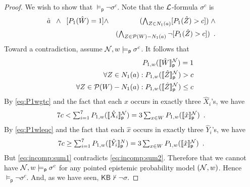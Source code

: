 \documentclass[12pt]{article}
\theoremstyle{definition}
\newcommand{\pow}{{\cal P}}    %
\newcommand{\N}{{\cal N}}      %
\newcommand{\Lang}{{\cal L}}   %
\newcommand{\KB}{{\mathsf{KB}}}                        %
\newcommand{\modelsp}{\models_{\mathsf{p}}}                  %
\newcommand{\semp}[1]{\llbracket{#1}\rrbracket_{\mathsf{p}}} %
\begin{document}
\begin{proof}
  We wish to show that $\modelsp\lnot\sigma^c$.
  Note that the $\Lang$-formula $\sigma^c$ is
  \begin{eqnarray*}
    \hat a \;\;\land\;\; [P_1(\hat W)=1] &\land& 
    \textstyle(\bigwedge_{Z\in N_1(a)} [P_1(\hat Z)>c])
    \;\land 
    \\
    && 
    \textstyle(\bigwedge_{Z\in\pow(W)-N_1(a)}\lnot [P_1(\hat Z)>c]) \enspace.
  \end{eqnarray*}
  Toward a contradiction, assume $\N,w\modelsp\sigma^c$.  It follows that
  \begin{eqnarray}
    && P_{1,w}(\semp{\hat W}^\N)=1
    \label{eq:P1weq1}
    \\
    && \forall Z\in N_1(a): P_{1,w}(\semp{\hat Z}^\N)>c
    \label{eq:P1wgtc}
    \\
    && \forall Z\in\pow(W)-N_1(a): P_{1,w}(\semp{\hat Z}^\N)\leq c
    \label{eq:P1wleqc}
  \end{eqnarray}
  By \eqref{eq:P1wgtc} and the fact that each $\hat x$ occurs
  in exactly three $\hat X_i$'s, we have
  \begin{equation}
    \textstyle
    7c<\sum_{i=1}^7P_{1,w}(\semp{\hat X_i}^\N)=3\sum_{x\in W}P_{1,w}(\semp{\hat x}^\N)\enspace.
    \label{eq:incomp:sum1}
  \end{equation}
  By \eqref{eq:P1wleqc} and the fact that each $\hat x$ occurs
  in exactly three $\hat Y_i$'s, we have
  \begin{equation}
    \textstyle
    7c\geq\sum_{i=1}^7P_{1,w}(\semp{\hat Y_i}^N)=3\sum_{x\in W}P_{1,w}(\semp{\hat x}^\N)\enspace.
    \label{eq:incomp:sum2}
  \end{equation}
  But \eqref{eq:incomp:sum1} contradicts \eqref{eq:incomp:sum2}.
  Therefore that we cannot have $\N,w\modelsp\sigma^c$ for any pointed epistemic probability
  model $(\N,w)$.  Hence $\modelsp\lnot\sigma^c$.  And, as we have seen,
  $\KB\nvdash\lnot\sigma$.
\end{proof}
\end{document}
